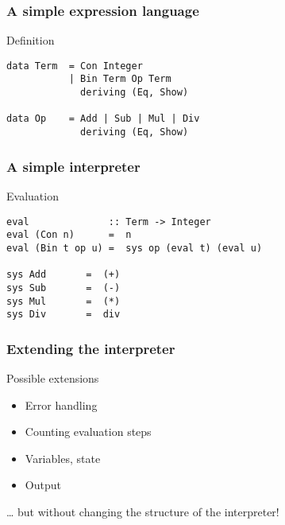 \documentclass{beamer}
\subtitle{Interpreters and Monads}
\begin{document}
\begin{frame}
  \titlepage
\end{frame}



\begin{frame}[fragile]
  \frametitle{A simple expression language}
\begin{block}{Definition}
\begin{lstlisting}
data Term  = Con Integer
           | Bin Term Op Term  
             deriving (Eq, Show)
           
data Op    = Add | Sub | Mul | Div
             deriving (Eq, Show)
\end{lstlisting}  
\end{block}
\end{frame}             

\begin{frame}[fragile]
  \frametitle{A simple interpreter}
\begin{block}{Evaluation}
\begin{lstlisting}
eval              :: Term -> Integer
eval (Con n)      =  n
eval (Bin t op u) =  sys op (eval t) (eval u)

sys Add       =  (+)         
sys Sub       =  (-)
sys Mul       =  (*)         
sys Div       =  div
\end{lstlisting}  
\end{block}
\end{frame}             

\begin{frame}[fragile]
  \frametitle{Extending the interpreter}
  \begin{block}{Possible extensions}
    \begin{itemize}
    \item Error handling
    \item Counting evaluation steps
    \item Variables, state
    \item Output
    \end{itemize}
    \dots{} but without changing the structure of the interpreter!
  \end{block}
\end{frame}
\end{document}
